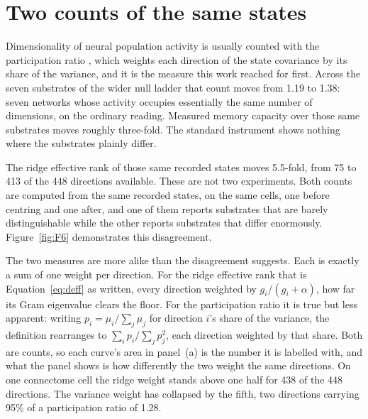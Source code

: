 \section{Two counts of the same states}
\label{sec:act2-counting}
\bigskip


Dimensionality of neural population activity is usually counted with the participation
ratio \cite{gao2017theory}, which weights each direction of the state covariance by its share of the
variance, and it is the measure this work reached for first. Across the seven
substrates of the wider null ladder that count moves
from 1.19 to 1.38: %
seven networks whose activity occupies essentially the same number of
dimensions, on the ordinary reading. Measured memory capacity over those same
substrates moves roughly three-fold. %
The standard instrument shows nothing where the substrates plainly differ.

The ridge effective rank of those same recorded states moves
5.5-fold, %
from 75 to 413 %
of the 448 directions available. These are not two experiments. Both counts are
computed from the same recorded states, on the same cells, one before centring
and one after, and one of them reports substrates that are barely
distinguishable while the other reports substrates that differ enormously.
Figure~\ref{fig:F6} demonstrates this disagreement.

The two measures are more alike than the disagreement suggests. Each is exactly
a sum of one weight per direction. For the ridge effective rank that is
Equation~\ref{eq:deff} as written, every direction weighted by
$g_i/(g_i + \alpha)$, how far its Gram eigenvalue clears the floor. For the
participation ratio it is true but less apparent: writing
$p_i = \mu_i / \sum_j \mu_j$ for direction $i$'s share of the variance, the
definition rearranges to $\sum_i p_i / \sum_j p_j^{2}$, each direction weighted
by that share. Both are counts, so each curve's area in panel~(a) is the number
it is labelled with, and what the panel shows is how differently the two weight
the same directions. On one connectome cell the ridge weight stands above one
half for 438 of the 448 %
directions. The variance weight has collapsed by the fifth, two directions
carrying 95\% %
of a participation ratio of 1.28. %

